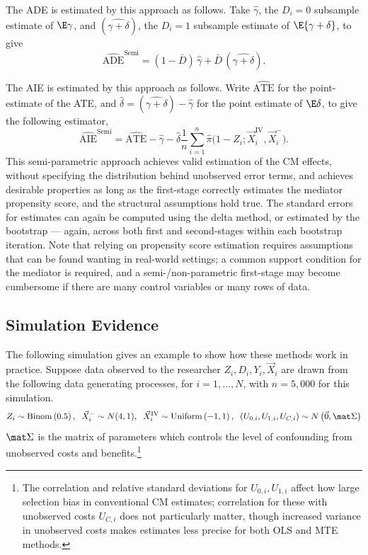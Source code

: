 The ADE is estimated by this approach as follows.
Take $\hat \gamma$, the $D_i = 0$ subsample estimate of $\E \gamma$, and $(\hat{\gamma + \delta})$, the $D_i = 1$ subsample estimate of $\E{\gamma + \delta}$, to give
\[ \hat{\text{ADE}}^{\text{Semi}}
    = (1 - \bar D) \, \hat \gamma + \bar D \, (\hat{\gamma + \delta}). \]

The AIE is estimated by this approach as follows.
Write $\hat{\text{ATE}}$ for the point-estimate of the ATE, and 
$\hat\delta = (\hat{\gamma + \delta}) - \hat\gamma$ for the point estimate of $\E \delta$, to give the following estimator,
\[ \hat{\text{AIE}}^{\text{Semi}}
    = \hat{\text{ATE}}
    - \hat\gamma
    - \hat\delta \frac{1}{n} \sum_{i=1}^{n}
    \hat\pi \bigl( 1-Z_i; \vec X_i^{\mathrm{IV}}, \vec X_i^- \bigr).
\]
This semi-parametric approach achieves valid estimation of the CM effects, without specifying the distribution behind unobserved error terms, and achieves desirable properties as long as the first-stage correctly estimates the mediator propensity score, and the structural assumptions hold true.
The standard errors for estimates can again be computed using the delta method, or estimated by the bootstrap --- again, across both first and second-stages within each bootstrap iteration.
Note that relying on propensity score estimation requires assumptions that can be found wanting in real-world settings; a common support condition for the mediator is required, and a semi-/non-parametric first-stage may become cumbersome if there are many control variables or many rows of data.

\subsection{Simulation Evidence}
\label{sec:simulations}
The following simulation gives an example to show how these methods work in practice.
Suppose data observed to the researcher $Z_i, D_i, Y_i, \vec X_i$ are drawn from the following data generating processes, for $i = 1, \hdots, N$, with 
$n = 5,000$ for this simulation.
\[ Z_i \sim \text{Binom}\left(0.5 \right),
    \;\; \vec X_i^- \sim N(4, 1),
    \;\; \vec X_i^{\text{IV}} \sim \text{Uniform}\left( -1, 1 \right),
    \;\; \left( U_{0,i}, U_{1,i}, U_{C,i} \right) \sim
    N\left( \vec 0, \mat \Sigma \right) \]
$\mat \Sigma$ is the matrix of parameters which controls the level of confounding from unobserved costs and benefits.\footnote{
    The correlation and relative standard deviations for $U_{0,i}, U_{1,i}$ affect how large selection bias in conventional CM estimates; correlation for these with unobserved costs $U_{C,i}$ does not particularly matter, though increased variance in unobserved costs makes estimates less precise for both OLS and MTE methods.
}

